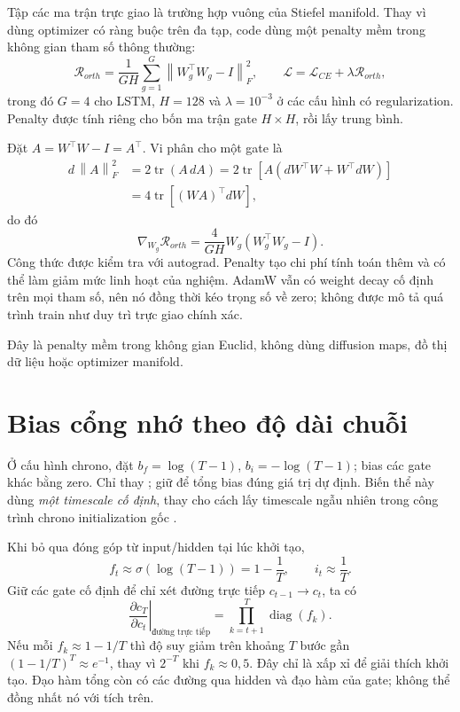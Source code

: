 \documentclass[12pt,a4paper]{report}
\numberwithin{equation}{chapter}
\newcommand{\norm}[1]{\left\lVert #1 \right\rVert}
\newcommand{\code}[1]{\texttt{\detokenize{#1}}}
\begin{document}
Tập các ma trận trực giao là trường hợp vuông của Stiefel manifold. Thay vì dùng optimizer có ràng buộc trên đa tạp, code dùng một penalty mềm trong không gian tham số thông thường:
\begin{equation}
\mathcal{R}_{orth}=\frac{1}{GH}\sum_{g=1}^{G}\norm{W_g^\top W_g-I}_F^2,
\qquad \mathcal{L}=\mathcal{L}_{CE}+\lambda\mathcal{R}_{orth},
\end{equation}
trong đó $G=4$ cho LSTM, $H=128$ và $\lambda=10^{-3}$ ở các cấu hình có regularization. Penalty được tính riêng cho bốn ma trận gate $H\times H$, rồi lấy trung bình.

Đặt $A=W^\top W-I=A^\top$. Vi phân cho một gate là
\begin{align}
d\,\norm{A}_F^2
&=2\operatorname{tr}(A\,dA)
 =2\operatorname{tr}\!\left[A(dW^\top W+W^\top dW)\right]\\
&=4\operatorname{tr}\!\left[(WA)^\top dW\right],
\end{align}
do đó
\begin{equation}
\nabla_{W_g}\mathcal{R}_{orth}=\frac{4}{GH}W_g(W_g^\top W_g-I).
\end{equation}
Công thức được kiểm tra với autograd. Penalty tạo chi phí tính toán thêm và có thể làm giảm mức linh hoạt của nghiệm. AdamW vẫn có weight decay cố định trên mọi tham số, nên nó đồng thời kéo trọng số về zero; không được mô tả quá trình train như duy trì trực giao chính xác.

Đây là penalty mềm trong không gian Euclid, không dùng diffusion maps, đồ thị dữ liệu hoặc optimizer manifold.

\section{Bias cổng nhớ theo độ dài chuỗi}
Ở cấu hình chrono, đặt $b_f=\log(T-1)$, $b_i=-\log(T-1)$; bias các gate khác bằng zero. Chỉ thay \code{bias_ih}; giữ \code{bias_hh=0} để tổng bias đúng giá trị dự định. Biến thể này dùng \emph{một timescale cố định}, thay cho cách lấy timescale ngẫu nhiên trong công trình chrono initialization gốc \cite{chrono}.

Khi bỏ qua đóng góp từ input/hidden tại lúc khởi tạo,
\begin{equation}
f_t\approx\sigma(\log(T-1))=1-\frac1T,
\qquad i_t\approx\frac1T.
\end{equation}
Giữ các gate cố định để chỉ xét đường trực tiếp $c_{t-1}\to c_t$, ta có
\begin{equation}
\left.\frac{\partial c_T}{\partial c_t}\right|_{\text{đường trực tiếp}}
=\prod_{k=t+1}^{T}\operatorname{diag}(f_k).
\end{equation}
Nếu mỗi $f_k\approx1-1/T$ thì độ suy giảm trên khoảng $T$ bước gần $(1-1/T)^T\approx e^{-1}$, thay vì $2^{-T}$ khi $f_k\approx0,5$. Đây chỉ là xấp xỉ để giải thích khởi tạo. Đạo hàm tổng còn có các đường qua hidden và đạo hàm của gate; không thể đồng nhất nó với tích trên.
\end{document}
